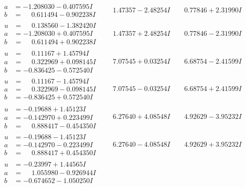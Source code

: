 \documentclass[1p]{elsarticle_modified}
\theoremstyle{definition}
\begin{document}
$$\begin{array}{c|c|c}
\begin{aligned}
a &= -1.208030 - 0.407595 I \\
b &= \phantom{-}0.611494 - 0.902238 I\end{aligned}
 & \phantom{-}1.47357 - 2.48254 I & \phantom{-}0.77846 + 2.31990 I \\ \hline\begin{aligned}
u &= \phantom{-}0.138560 - 1.382420 I \\
a &= -1.208030 + 0.407595 I \\
b &= \phantom{-}0.611494 + 0.902238 I\end{aligned}
 & \phantom{-}1.47357 + 2.48254 I & \phantom{-}0.77846 - 2.31990 I \\ \hline\begin{aligned}
u &= \phantom{-}0.11167 + 1.45794 I \\
a &= \phantom{-}0.322969 + 0.098145 I \\
b &= -0.836425 - 0.572540 I\end{aligned}
 & \phantom{-}7.07545 + 0.03254 I & \phantom{-}6.68754 - 2.41599 I \\ \hline\begin{aligned}
u &= \phantom{-}0.11167 - 1.45794 I \\
a &= \phantom{-}0.322969 - 0.098145 I \\
b &= -0.836425 + 0.572540 I\end{aligned}
 & \phantom{-}7.07545 - 0.03254 I & \phantom{-}6.68754 + 2.41599 I \\ \hline\begin{aligned}
u &= -0.19688 + 1.45123 I \\
a &= -0.142970 + 0.223499 I \\
b &= \phantom{-}0.888417 - 0.454350 I\end{aligned}
 & \phantom{-}6.27640 + 4.08548 I & \phantom{-}4.92629 - 3.95232 I \\ \hline\begin{aligned}
u &= -0.19688 - 1.45123 I \\
a &= -0.142970 - 0.223499 I \\
b &= \phantom{-}0.888417 + 0.454350 I\end{aligned}
 & \phantom{-}6.27640 - 4.08548 I & \phantom{-}4.92629 + 3.95232 I \\ \hline\begin{aligned}
u &= -0.23997 + 1.44565 I \\
a &= \phantom{-}1.055980 - 0.926944 I \\
b &= -0.674652 - 1.050250 I\end{aligned}

\end{array}$$
\end{document}
